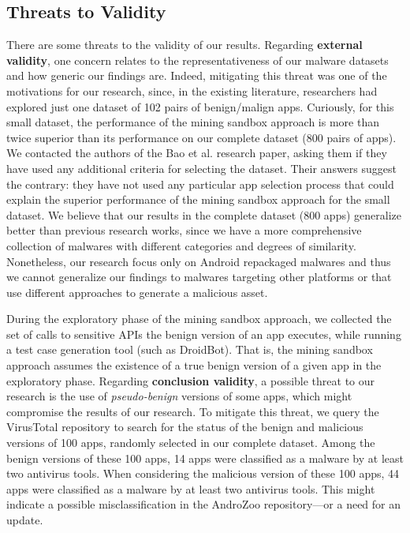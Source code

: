 \subsection{Threats to Validity}\label{sec:threats}


There are some threats to the validity of our results.
Regarding {\bf external validity}, one concern relates to the 
representativeness of our malware datasets and how generic our findings are.
Indeed, mitigating this threat was one of the motivations for our research,
since, in the existing literature, researchers had explored just
one dataset of 102 pairs of benign/malign apps. Curiously,
for this small dataset, the performance of the
mining sandbox approach is more than twice superior
than its performance on our complete dataset (800 pairs of
apps). We contacted the authors of the Bao et al. research paper, asking them
if they have used any additional criteria for selecting the
dataset. Their answers suggest the contrary: they have not used
any particular app selection process that
could explain the superior performance of the mining
sandbox approach for the small dataset. We believe that
our results in the complete dataset (800 apps) generalize better than previous research works,
since we have a more comprehensive collection of malwares with different
categories and degrees of similarity. Nonetheless, our
research focus only on Android repackaged malwares and thus we
cannot generalize our findings to malwares targeting
other platforms or that use different approaches to
generate a malicious asset.

During the exploratory phase of the mining sandbox approach,
we collected the set of calls to sensitive APIs the benign version of
an app executes, while running a test case generation tool (such as
DroidBot). That is, the mining sandbox approach assumes the existence of a true benign
version of a given app in the exploratory phase. Regarding {\bf conclusion validity}, a
possible threat to our research is the use of \emph{pseudo-benign} versions
of some apps, which might compromise the results of our research.
To mitigate this threat, we query the VirusTotal repository to search for the
status of the benign and malicious versions of 100 apps,
randomly selected in our complete dataset. Among the benign
versions of these 100 apps, 14 apps were classified as a malware 
by at least two antivirus tools. When considering
the malicious version of these 100 apps, 44 apps were
classified as a malware by at least two antivirus tools. This might indicate
a possible misclassification in the AndroZoo repository---or a need
for an update. 


